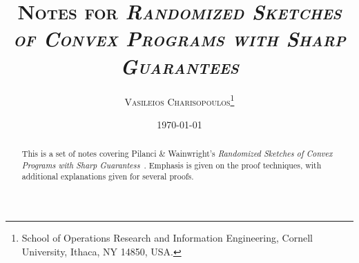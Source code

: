 \documentclass[a4paper]{article}
\begin{document}
\title{\textsc{
	Notes for \textit{Randomized Sketches of Convex Programs with Sharp
	Guarantees}}}
\author{
    \textsc{Vasileios Charisopoulos}\thanks{\quad
        School of Operations Research and Information Engineering, Cornell University,
        Ithaca, NY 14850, USA.
   }}
\date{\today}
\maketitle

\begin{abstract}
This is a set of notes covering Pilanci \& Wainwright's \textit{Randomized
Sketches of Convex Programs with Sharp Guarantess}~\cite{PilWain15}. Emphasis
is given on the proof techniques, with additional explanations given for
several proofs.
\end{abstract}




\end{document}
